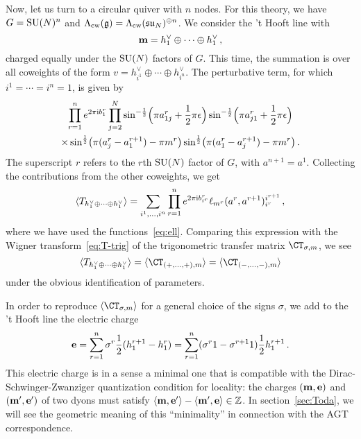 Now, let us turn to a circular quiver with $n$ nodes.  For this
theory, we have $G = \mathrm{SU}(N)^n$ and
$\Lambda_{\mathrm{cw}}(\mathfrak{g}) = \Lambda_{\mathrm{cw}}(\mathfrak{su}_N)^{\oplus n}$.  We consider the 't
Hooft line with
\begin{equation}
  \label{eq:B-circular}
  \mathbf{m} =  h^\vee_1 \oplus \dotsb \oplus h^\vee_1 \,,
\end{equation}
charged equally under the $\mathrm{SU}(N)$ factors of $G$.  This time, the
summation is over all coweights of the form
$v = h^\vee_{i^1} \oplus \dotsb \oplus h^\vee_{i^n}$.  The perturbative term,
for which $i^1 = \dotsb = i^n = 1$, is given by
\begin{multline}
  \label{eq:T-circ-pert}
  \prod_{r=1}^n
  e^{2\pi\mathrm{i} b^r_1}
  \prod_{j=2}^N
  \sin^{-\frac12}\Bigl(\pi a^r_{1j} + \frac12 \pi\epsilon\Bigr)
  \sin^{-\frac12}\Bigl(\pi a^r_{j1} + \frac12 \pi\epsilon\Bigr)
  \\
  \times
  \sin^{\frac12}\bigl(\pi(a^r_j - a^{r+1}_1) - \pi m^r \bigr)
  \sin^{\frac12}\bigl(\pi(a^r_1 - a^{r+1}_j) - \pi m^r\bigr)
  \,.
\end{multline}
The superscript $r$ refers to the $r$th $\mathrm{SU}(N)$ factor of $G$, with
$a^{n+1} = a^1$.  Collecting the contributions from the other
coweights, we get
\begin{equation}
  \langle T_{h^\vee_1 \oplus \dotsb \oplus h^\vee_1} \rangle
  =
  \sum_{i^1, \dotsc, i^n}
  \prod_{r=1}^n
  e^{2\pi\mathrm{i} b^r_{i^r}}
  \ell_{m^r}(a^r, a^{r+1})_{i^r}^{i^{r+1}} \,,
\end{equation}
where we have used the functions~\eqref{eq:ell}.
Comparing this expression with the Wigner transform~\eqref{eq:T-trig}
of the trigonometric transfer matrix $\CT_{\sigma,m}$, we see
\begin{equation}
  \vev{T_{h^\vee_1 \oplus \dotsb \oplus h^\vee_1}}
  =
  \vev{\CT_{(+,\dotsc,+), m}}
  =
  \vev{\CT_{(-,\dotsc,-), m}}
\end{equation}
under the obvious identification of parameters.

In order to reproduce $\vev{\CT_{\sigma,m}}$ for a general choice of
the signs $\sigma$, we add to the 't Hooft line the electric charge
\begin{equation}
  \label{eq:E-circular}
  \mathbf{e}
  = \sum_{r=1}^n \sigma^r \frac12(h^{r+1}_1 - h^r_1)
  = \sum_{r=1}^n (\sigma^r 1 - \sigma^{r+1} 1)  \frac12 h^{r+1}_1 \,.
\end{equation}
This electric charge is in a sense a minimal one that is compatible
with the Dirac-Schwinger-Zwanziger quantization condition for
locality: the charges $(\mathbf{m},\mathbf{e})$ and
$(\mathbf{m}',\mathbf{e}')$ of two dyons must satisfy
$\langle \mathbf{m}, \mathbf{e}'\rangle - \langle \mathbf{m}',
\mathbf{e}\rangle \in \mathbb{Z}$.  In section~\ref{sec:Toda}, we will see the
geometric meaning of this ``minimality'' in connection with the AGT
correspondence.

